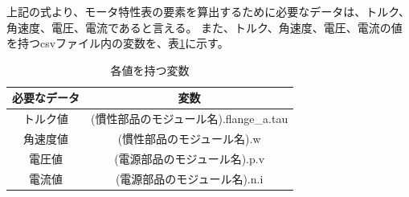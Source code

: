 上記の式より、モータ特性表の要素を算出するために必要なデータは、トルク、角速度、電圧、電流であると言える。
また、トルク、角速度、電圧、電流の値を持つcsvファイル内の変数を、表\ref{tab:hensuu}に示す。　
\begin{table}[t]
	\centering
	\caption{各値を持つ変数}
	\begin{tabular}{|c|c|} \hline
	  必要なデータ & 変数 \\ \hline \hline
	  トルク値 & (慣性部品のモジュール名).flange\_a.tau \\ \hline
	  角速度値 &  (慣性部品のモジュール名).w \\ \hline
	  電圧値 &  (電源部品のモジュール名).p.v \\ \hline
	  電流値 &  (電源部品のモジュール名).n.i \\ \hline
	\end{tabular}
	\label{tab:hensuu}
  \end{table}

